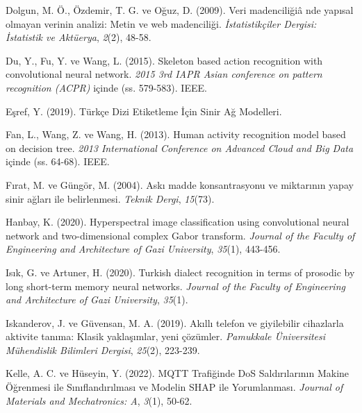 \documentclass[12pt,twoside]{deuthesis}
\begin{document}
\begin{CSLReferences}{1}{0}
\leavevmode{}%
Dolgun, M. Ö., Özdemir, T. G. ve Oğuz, D. (2009). Veri madencili{ğ}i{â} nde yap{ı}sal olmayan verinin analizi: Metin ve web madencili{ğ}i. \emph{{İ}statistik{ç}iler Dergisi: {İ}statistik ve Akt{ü}erya}, \emph{2}(2), 48-58.

\leavevmode{}%
Du, Y., Fu, Y. ve Wang, L. (2015). Skeleton based action recognition with convolutional neural network. \emph{2015 3rd IAPR Asian conference on pattern recognition (ACPR)} içinde (ss. 579-583). IEEE.

\leavevmode{}%
Eşref, Y. (2019). T{ü}rk{ç}e Dizi Etiketleme {İ}{ç}in Sinir A{ğ} Modelleri.

\leavevmode{}%
Fan, L., Wang, Z. ve Wang, H. (2013). Human activity recognition model based on decision tree. \emph{2013 International Conference on Advanced Cloud and Big Data} içinde (ss. 64-68). IEEE.

\leavevmode{}%
Fırat, M. ve Güngör, M. (2004). Ask{ı} madde konsantrasyonu ve miktar{ı}n{ı}n yapay sinir a{ğ}lar{ı} ile belirlenmesi. \emph{Teknik Dergi}, \emph{15}(73).

\leavevmode{}%
Hanbay, K. (2020). Hyperspectral image classification using convolutional neural network and two-dimensional complex Gabor transform. \emph{Journal of the Faculty of Engineering and Architecture of Gazi University}, \emph{35}(1), 443-456.

\leavevmode{}%
Isık, G. ve Artuner, H. (2020). Turkish dialect recognition in terms of prosodic by long short-term memory neural networks. \emph{Journal of the Faculty of Engineering and Architecture of Gazi University}, \emph{35}(1).

\leavevmode{}%
Iskanderov, J. ve Güvensan, M. A. (2019). Ak{ı}ll{ı} telefon ve giyilebilir cihazlarla aktivite tan{ı}ma: Klasik yakla{ş}{ı}mlar, yeni {ç}{ö}z{ü}mler. \emph{Pamukkale {Ü}niversitesi M{ü}hendislik Bilimleri Dergisi}, \emph{25}(2), 223-239.

\leavevmode{}%
Kelle, A. C. ve Hüseyin, Y. (2022). MQTT Trafi{ğ}inde DoS Sald{ı}r{ı}lar{ı}n{ı}n Makine {Ö}{ğ}renmesi ile S{ı}n{ı}fland{ı}r{ı}lmas{ı} ve Modelin SHAP ile Yorumlanmas{ı}. \emph{Journal of Materials and Mechatronics: A}, \emph{3}(1), 50-62.


\end{CSLReferences}
\end{document}
